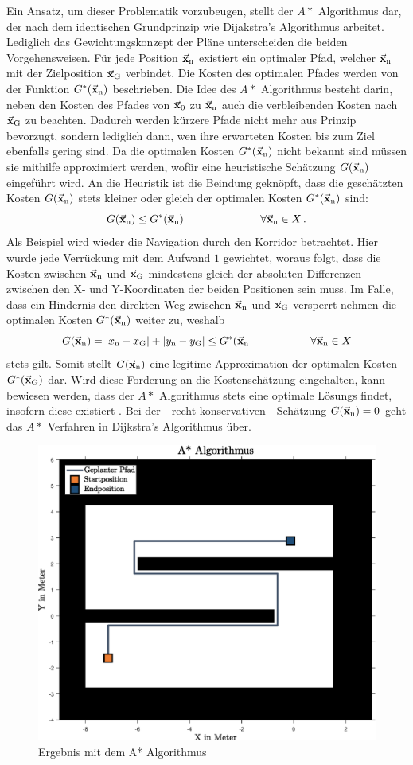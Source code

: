 Ein Ansatz, um dieser Problematik vorzubeugen, stellt der $A*$ Algorithmus dar, der nach dem identischen Grundprinzip wie Dijakstra's Algorithmus arbeitet. Lediglich das Gewichtungskonzept der Pläne unterscheiden die beiden Vorgehensweisen. Für jede Position $\vec{\mathbf{x}}_{\text{n}}$ existiert ein optimaler Pfad, welcher $\vec{\mathbf{x}}_{\text{n}}$ mit der Zielposition $\vec{\mathbf{x}}_{\text{G}}$ verbindet. Die Kosten des optimalen Pfades werden von der Funktion $G^*(\vec{\mathbf{x}}_{\text{n}})$ beschrieben. Die Idee des $A*$ Algorithmus besteht darin, neben den Kosten des Pfades von $\vec{\mathbf{x}}_{\text{0}}$ zu $\vec{\mathbf{x}}_{\text{n}}$ auch die verbleibenden Kosten nach $\vec{\mathbf{x}}_{\text{G}}$ zu beachten. Dadurch werden kürzere Pfade nicht mehr aus Prinzip bevorzugt, sondern lediglich dann, wen ihre erwarteten Kosten bis zum Ziel ebenfalls gering sind. Da die optimalen Kosten $G^*(\vec{\mathbf{x}}_{\text{n}})$ nicht bekannt sind müssen sie mithilfe approximiert werden, wofür eine heuristische Schätzung $G(\vec{\mathbf{x}}_{\text{n}})$ eingeführt wird. An die Heuristik ist die Beindung geknöpft, dass die geschätzten Kosten $G(\vec{\mathbf{x}}_{\text{n}})$ stets kleiner oder gleich der optimalen Kosten $G^*(\vec{\mathbf{x}}_{\text{n}})$ sind:
\begin{equation}
G(\vec{\mathbf{x}}_{\text{n}}) \leq G^*(\vec{\mathbf{x}}_{\text{n}}) \hspace{2.5cm} \forall \vec{\mathbf{x}}_{\text{n}} \in X\,.
\end{equation}
Als Beispiel wird wieder die Navigation durch den Korridor betrachtet. Hier wurde jede Verrückung mit dem Aufwand $1$ gewichtet, woraus folgt, dass die Kosten zwischen $\vec{\mathbf{x}}_{\text{n}}$ und $\vec{\mathbf{x}}_{\text{G}}$ mindestens gleich der absoluten Differenzen zwischen den X- und Y-Koordinaten der beiden Positionen sein muss. Im Falle, dass ein Hindernis den direkten Weg zwischen $\vec{\mathbf{x}}_{\text{n}}$ und $\vec{\mathbf{x}}_{\text{G}}$ versperrt nehmen die optimalen Kosten $G^*(\vec{\mathbf{x}}_{\text{n}})$ weiter zu, weshalb
\begin{equation}
G(\vec{\mathbf{x}}_{\text{n}}) = \vert x_{\text{n}} - x_{\text{G}}\vert + \vert y_{\text{n}} - y_{\text{G}}\vert \leq G^*(\vec{\mathbf{x}}_{\text{n}} \hspace{2cm} \forall \vec{\mathbf{x}}_{\text{n}} \in X
\end{equation}
stets gilt. Somit stellt $G(\vec{\mathbf{x}}_{\text{n}})$ eine legitime Approximation der optimalen Kosten $G^*(\vec{\mathbf{x}}_{\text{G}})$ dar. Wird diese Forderung an die Kostenschätzung eingehalten, kann bewiesen werden, dass der $A*$ Algorithmus stets eine optimale Lösungs findet, insofern diese existiert \cite[S. 32]{PlanAlgo}\cite{SecRef1,SecRef2}. Bei der - recht konservativen - Schätzung $G(\vec{\mathbf{x}}_{\text{n}})=0$ geht das $A*$ Verfahren in Dijkstra's Algorithmus über.
\begin{figure}[ht!]
\centering
\includegraphics[width=0.5\linewidth]{img/KorridorBeispiel_img7.eps}
\caption{Ergebnis mit dem A* Algorithmus}
\end{figure}